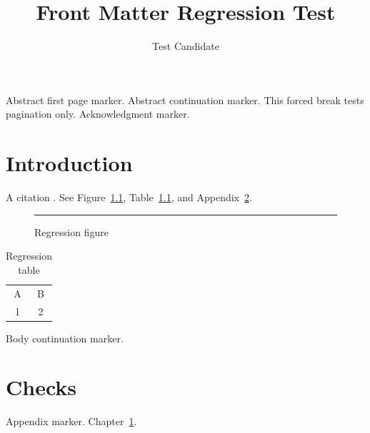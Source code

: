 \documentclass[a4paper,separatefrontmatter]{ustthesis}
\title{Front Matter Regression Test}
\author{Test Candidate}
\begin{document}
\maketitle
\abstract
Abstract first page marker.
\newpage
Abstract continuation marker. This forced break tests pagination only.
\endabstract
\makeapprovalpages
\makeapprovalpages %
\acknowledgments Acknowledgment marker.\endacknowledgments
\tableofcontents
\listoffigures
\listoftables
\chapter{Introduction}\label{ch:intro}
A citation \citep{guidelines}. See Figure~\ref{fig:test}, Table~\ref{tab:test},
and Appendix~\ref{app:test}.
\begin{figure}[ht]\centering\rule{20mm}{10mm}
\caption{Regression figure}\label{fig:test}\end{figure}
\begin{table}[ht]\centering\begin{tabular}{cc}A&B\\1&2\end{tabular}
\caption{Regression table}\label{tab:test}\end{table}
\clearpage
Body continuation marker.
\clearpage
{}

\appendix\chapter{Checks}\label{app:test}
Appendix marker. Chapter~\ref{ch:intro}.
\end{document}
